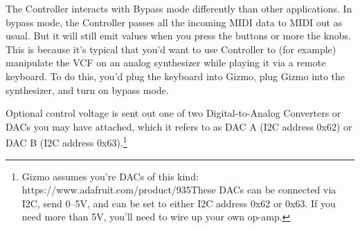 \documentclass{article}
\begin{document}
The Controller interacts with Bypass mode differently than other applications.  In bypass mode, the Controller passes all the incoming MIDI data to MIDI out as usual.  But it will still emit values when you press the buttons or more the knobs.  This is because it's typical that you'd want to use Controller to (for example) manipulate the VCF on an analog synthesizer while playing it via a remote keyboard.  To do this, you'd plug the keyboard into Gizmo, plug Gizmo into the synthesizer, and turn on bypass mode.

Optional control voltage is sent out one of two Digital-to-Analog Converters or DACs you may have attached, which it refers to as DAC A (I2C address 0x62) or DAC B (I2C address 0x63).\footnote{Gizmo assumes you're DACs of this kind: https:/\!/www.adafruit.com/product/935\quad These DACs can be connected via I2C, send 0--5V, and can be set to either I2C address 0x62 or 0x63.  If you need more than 5V, you'll need to wire up your own op-amp.}
\end{document}
